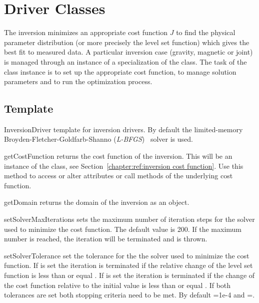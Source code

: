 \section{Driver Classes}
The inversion minimizes an appropriate cost function $J$ to find the physical parameter distribution 
(or more precisely the level set function) which gives the best fit to measured data. A 
particular inversion case (gravity, magnetic or joint) is managed through 
an instance of a specialization of the  class. The task of the class instance
is to set up the appropriate cost function, to manage solution parameters and to run the optimization process.

\subsection{Template}
\begin{classdesc*}{InversionDriver}
template for inversion drivers. By default the limited-memory Broyden-Fletcher-Goldfarb-Shanno (\emph{L-BFGS})~\cite{Nocedal1980} solver is used.
\end{classdesc*}
 
\begin{methoddesc}[InversionDriver]{getCostFunction}{}
returns the cost function of the inversion. This will be an instance of the  class, see Section~\ref{chapter:ref:inversion cost function}.
Use this method to access or alter attributes or call methods of the underlying cost function.
\end{methoddesc}

\begin{methoddesc}[InversionDriver]{getDomain}{}
returns the domain of the inversion as an \escript {} object.
\end{methoddesc}

        
\begin{methoddesc}[InversionDriver]{setSolverMaxIterations}{}
sets the maximum number of iteration steps for the solver used to minimize the cost function. The default value is 200.
If the maximum number is reached, the iteration will be terminated and  is thrown.
\end{methoddesc}

\begin{methoddesc}[InversionDriver]{setSolverTolerance}{ }
set the tolerance for the the solver used to minimize the cost function. If  is set the iteration is terminated 
if the relative change of the level set function is less than or equal . 
If  is set the iteration is terminated if the change of the cost
function relative to the initial value is less than or equal .
If both tolerances are set both stopping criteria need to be met.
By default =1e-4 and =\None.
\end{methoddesc}

